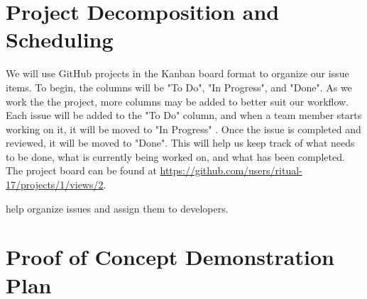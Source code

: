 \documentclass{article}
\begin{document}


\section{Project Decomposition and Scheduling}

  
  We will use GitHub projects in the Kanban board format to organize our 
  issue items. To begin, the columns will be "To Do", "In Progress", 
  and "Done". As we work the the project, more columns may be added to 
  better suit our workflow. Each issue will be added to the "To Do" column,
  and when a team member starts working on it, it will be moved to "In Progress"
  . Once the issue is completed and reviewed, it will be moved to
  "Done". This will help us keep track of what needs to be done, what is 
  currently being worked on, and what has been completed. The project 
  board can be found at 
  \url{https://github.com/users/ritual-17/projects/1/views/2}.
  
  help organize issues and assign them to developers. 



\section{Proof of Concept Demonstration Plan}
\end{document}
